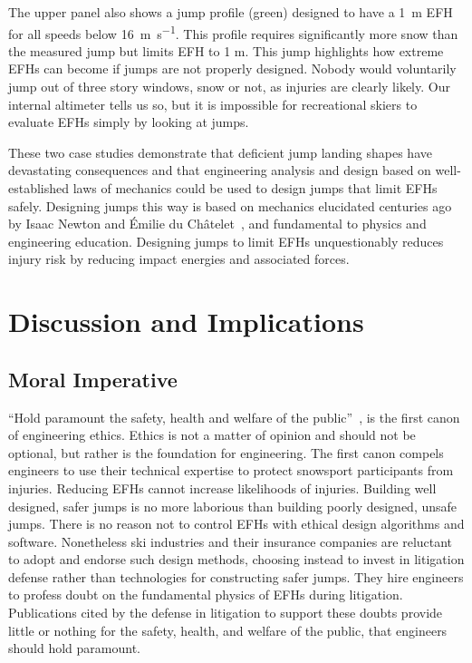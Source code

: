 \documentclass{article}
\begin{document}
The upper panel also shows a jump profile (green) designed to have a
1~\si{\meter} EFH for all speeds below 16~\si{\meter\per\second}. This profile
requires significantly more snow than the measured jump but limits EFH to 1 m.
This jump highlights how extreme EFHs can become if jumps are not properly
designed.  Nobody would voluntarily jump out of three story windows, snow or
not, as injuries are clearly likely. Our internal altimeter tells us so, but it
is impossible for recreational skiers to evaluate EFHs simply by looking at
jumps.

These two case studies demonstrate that deficient jump landing shapes have
devastating consequences and that engineering analysis and design based on
well-established laws of mechanics could be used to design jumps that limit
EFHs safely.  Designing jumps this way is based on mechanics elucidated
centuries ago by Isaac Newton and Émilie du Châtelet~\cite{Zinsser2007}, and
fundamental to physics and engineering education. Designing jumps to limit EFHs
unquestionably reduces injury risk by reducing impact energies and associated
forces.

\section{Discussion and Implications}
\subsection{Moral Imperative}
\label{sec:moral}
%
``Hold paramount the safety, health and welfare of the
public''~\cite{NSPE2019}, is the first canon of engineering ethics. Ethics is
not a matter of opinion and should not be optional, but rather is the
foundation for engineering. The first canon compels engineers to use their
technical expertise to protect snowsport participants from injuries. Reducing
EFHs cannot increase likelihoods of injuries. Building well designed, safer
jumps is no more laborious than building poorly designed, unsafe jumps. There
is no reason not to control EFHs with ethical design algorithms and software.
Nonetheless ski industries and their insurance companies are reluctant to adopt
and endorse such design methods, choosing instead to invest in litigation
defense rather than technologies for constructing safer jumps. They hire
engineers to profess doubt on the fundamental physics of EFHs during
litigation. Publications cited by the defense in litigation to support these
doubts provide little or nothing for the safety, health, and welfare of the
public, that engineers should hold paramount.
\end{document}

